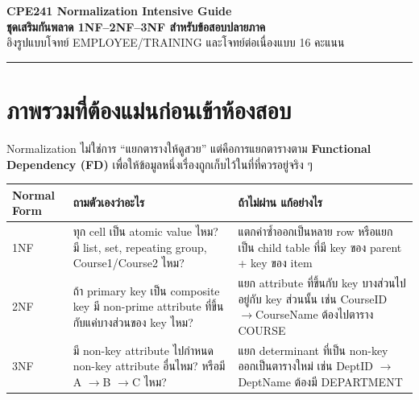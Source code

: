 \documentclass[a4paper,12pt]{article}
\newcommand{\fd}{\(\rightarrow\)}
\begin{document}
\begin{center}
    \textbf{\Large CPE241 Normalization Intensive Guide}\\
    \textbf{ชุดเสริมกันพลาด 1NF--2NF--3NF สำหรับข้อสอบปลายภาค}\\
    \vspace{0.2cm}
    อิงรูปแบบโจทย์ EMPLOYEE/TRAINING และโจทย์ต่อเนื่องแบบ 16 คะแนน
\end{center}
\hrule
\vspace{0.4cm}

\section*{ภาพรวมที่ต้องแม่นก่อนเข้าห้องสอบ}

Normalization ไม่ใช่การ ``แยกตารางให้ดูสวย'' แต่คือการแยกตารางตาม \textbf{Functional Dependency (FD)} เพื่อให้ข้อมูลหนึ่งเรื่องถูกเก็บไว้ในที่ที่ควรอยู่จริง ๆ

\begin{center}
\renewcommand{\arraystretch}{1.25}
\begin{tabular}{|p{2.4cm}|p{5.2cm}|p{6.6cm}|}
    \hline
    \rowcolor{gray!20}
    \textbf{Normal Form} & \textbf{ถามตัวเองว่าอะไร} & \textbf{ถ้าไม่ผ่าน แก้อย่างไร} \\
    \hline
    1NF & ทุก cell เป็น atomic value ไหม? มี list, set, repeating group, Course1/Course2 ไหม? & แตกค่าซ้ำออกเป็นหลาย row หรือแยกเป็น child table ที่มี key ของ parent + key ของ item \\
    \hline
    2NF & ถ้า primary key เป็น composite key มี non-prime attribute ที่ขึ้นกับแค่บางส่วนของ key ไหม? & แยก attribute ที่ขึ้นกับ key บางส่วนไปอยู่กับ key ส่วนนั้น เช่น CourseID \fd CourseName ต้องไปตาราง COURSE \\
    \hline
    3NF & มี non-key attribute ไปกำหนด non-key attribute อื่นไหม? หรือมี A \fd B \fd C ไหม? & แยก determinant ที่เป็น non-key ออกเป็นตารางใหม่ เช่น DeptID \fd DeptName ต้องมี DEPARTMENT \\
    \hline
\end{tabular}
\end{center}
\end{document}
